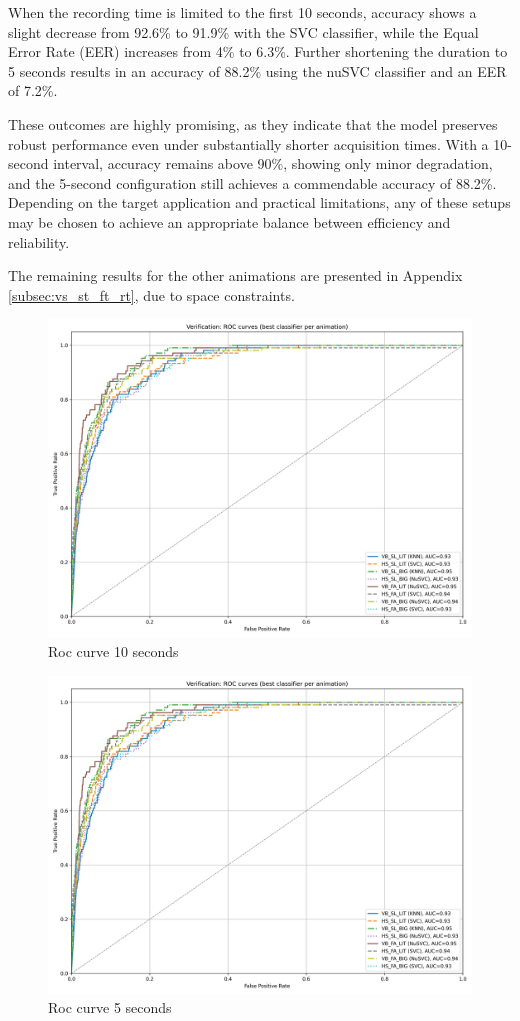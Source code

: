 \documentclass{article}
\begin{document}
When the recording time is limited to the first 10 seconds, accuracy shows a slight decrease from 92.6\% to 91.9\% with the SVC classifier, while the Equal Error Rate (EER) increases from 4\% to 6.3\%. 
Further shortening the duration to 5 seconds results in an accuracy of 88.2\% using the nuSVC classifier and an EER of 7.2\%.

These outcomes are highly promising, as they indicate that the model preserves robust performance even under substantially shorter acquisition times. 
With a 10-second interval, accuracy remains above 90\%, showing only minor degradation, and the 5-second configuration still achieves a commendable accuracy of 88.2\%.
Depending on the target application and practical limitations, any of these setups may be chosen to achieve an appropriate balance between efficiency and reliability.

The remaining results for the other animations are presented in Appendix \ref{subsec:vs_st_ft_rt}, due to space constraints.

\begin{figure}[ht]
    \centering
    \includegraphics[width = 0.6
    \textwidth]{Images/Results/Verification_single_five_ten/ft/five/best_animation_roc_curves_five_ft.png}
    \caption{Roc curve 10 seconds}
    \label{fig:roc_t_ft}
\end{figure}

\begin{figure}[ht]
    \centering
    \includegraphics[width = 0.6
    \textwidth]{Images/Results/Verification_single_five_ten/ft/five/best_animation_roc_curves_five_ft.png}
    \caption{Roc curve 5 seconds}
    \label{fig:roc_f_ft}
\end{figure}
\end{document}
